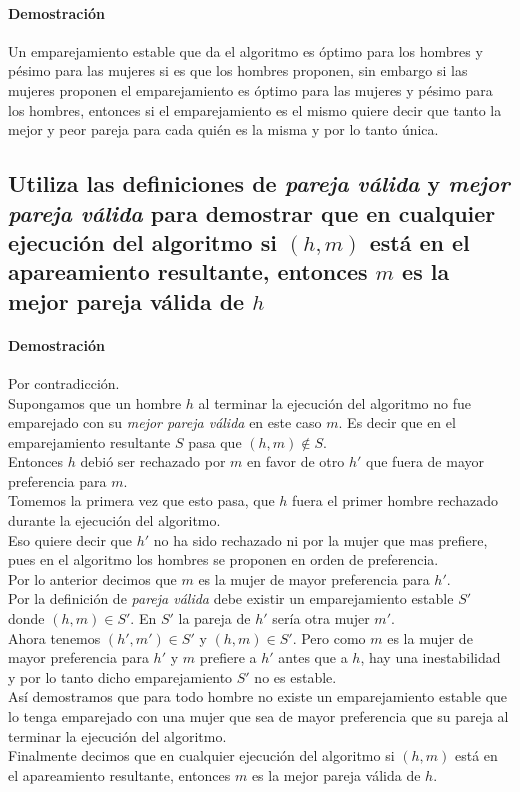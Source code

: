 \documentclass[12pt]{article}
\begin{document}
\paragraph{Demostración}\label{demos_gale}Un emparejamiento estable que da el algoritmo es óptimo para los hombres y pésimo para las mujeres si es que los hombres proponen, sin embargo si las mujeres proponen el emparejamiento es óptimo para las mujeres y pésimo para los hombres, entonces si el emparejamiento es el mismo quiere decir que tanto la mejor y peor pareja para cada quién es la misma y por lo tanto única.
\subsection{Utiliza las definiciones de \textit{pareja válida} y \textit{mejor pareja válida} para demostrar que en cualquier ejecución del algoritmo si $(h,m)$ está en el apareamiento resultante, entonces $m$ es la mejor pareja válida de $h$}
\paragraph{Demostración} Por contradicción.\\
Supongamos que un hombre $h$ al terminar  la ejecución del algoritmo no fue emparejado con su \textit{mejor pareja válida} en este caso $m$. Es decir que en el emparejamiento resultante $S$ pasa que $(h,m) \notin S$.\\ Entonces $h$ debió ser rechazado por $m$ en favor de otro $h'$ que fuera de mayor preferencia para $m$. \\
Tomemos la primera vez que esto pasa, que $h$ fuera el primer hombre rechazado durante la ejecución del algoritmo. 
\\Eso quiere decir que $h'$ no ha sido rechazado ni por la mujer que mas prefiere, pues en el algoritmo los hombres se proponen en orden de preferencia.
\\ Por lo anterior decimos que $m$ es la mujer de mayor preferencia para $h'$.\\
Por la definición de \textit{pareja válida} debe existir un emparejamiento estable $S'$ donde $(h,m)\in S'$. En $S'$  la pareja de $h'$ sería otra mujer $m'$. \\ Ahora tenemos $(h', m')\in S'$ y $(h,m) \in S'$.
Pero como $m$ es la mujer de mayor preferencia para $h'$ y $m$ prefiere a $h'$ antes que a $h$, hay una inestabilidad y por lo tanto dicho emparejamiento $S'$ no es estable.\\
 Así demostramos que para todo hombre no existe un emparejamiento estable que lo tenga emparejado con una mujer que sea de mayor preferencia que su pareja al terminar la ejecución del algoritmo.\\ 
Finalmente decimos que en cualquier ejecución del algoritmo si $(h,m)$ está en el apareamiento resultante, entonces $m$ es la mejor pareja válida de $h$.
\end{document}
